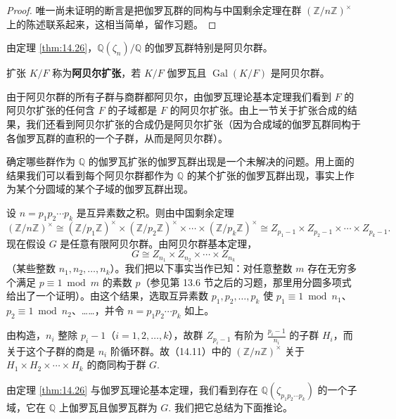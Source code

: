 \begin{proof}
唯一尚未证明的断言是把伽罗瓦群的同构与中国剩余定理在群 \((\mathbb{Z}/n\mathbb{Z})^\times\) 上的陈述联系起来，这相当简单，留作习题。
\end{proof}

由定理 \ref{thm:14.26}，\(\mathbb{Q}(\zeta_n)/\mathbb{Q}\) 的伽罗瓦群特别是阿贝尔群。

\begin{definition}
扩张 \(K/F\) 称为\textbf{阿贝尔扩张}，若 \(K/F\) 伽罗瓦且 \(\operatorname{Gal}(K/F)\) 是阿贝尔群。
\end{definition}

由于阿贝尔群的所有子群与商群都阿贝尔，由伽罗瓦理论基本定理我们看到 \(F\) 的阿贝尔扩张的任何含 \(F\) 的子域都是 \(F\) 的阿贝尔扩张。由上一节关于扩张合成的结果，我们还看到阿贝尔扩张的合成仍是阿贝尔扩张（因为合成域的伽罗瓦群同构于各伽罗瓦群的直积的一个子群，从而是阿贝尔群）。

确定哪些群作为 \(\mathbb{Q}\) 的伽罗瓦扩张的伽罗瓦群出现是一个未解决的问题。用上面的结果我们可以看到每个阿贝尔群都作为 \(\mathbb{Q}\) 的某个扩张的伽罗瓦群出现，事实上作为某个分圆域的某个子域的伽罗瓦群出现。

设 \(n = p_1p_2\cdots p_k\) 是互异素数之积。则由中国剩余定理
\begin{equation}
(\mathbb{Z}/n\mathbb{Z})^\times \cong (\mathbb{Z}/p_1\mathbb{Z})^\times \times (\mathbb{Z}/p_2\mathbb{Z})^\times \times \cdots \times (\mathbb{Z}/p_k\mathbb{Z})^\times \cong Z_{p_1-1} \times Z_{p_2-1} \times \cdots \times Z_{p_k-1}. \tag{14.11}
\end{equation}
现在假设 \(G\) 是任意有限阿贝尔群。由阿贝尔群基本定理，
\[
G \cong Z_{n_1} \times Z_{n_2} \times \cdots \times Z_{n_k}
\]
（某些整数 \(n_1, n_2, \ldots, n_k\)）。我们把以下事实当作已知：对任意整数 \(m\) 存在无穷多个满足 \(p \equiv 1 \bmod m\) 的素数 \(p\)（参见第 13.6 节之后的习题，那里用分圆多项式给出了一个证明）。由这个结果，选取互异素数 \(p_1, p_2, \ldots, p_k\) 使 \(p_1 \equiv 1 \bmod n_1\)、\(p_2 \equiv 1 \bmod n_2\)、……，并令 \(n = p_1p_2\cdots p_k\) 如上。

由构造，\(n_i\) 整除 \(p_i-1\)（\(i = 1, 2, \ldots, k\)），故群 \(Z_{p_i-1}\) 有阶为 \(\frac{p_i-1}{n_i}\) 的子群 \(H_i\)，而关于这个子群的商是 \(n_i\) 阶循环群。故（14.11）中的 \((\mathbb{Z}/n\mathbb{Z})^\times\) 关于 \(H_1 \times H_2 \times \cdots \times H_k\) 的商同构于群 \(G\).

由定理 \ref{thm:14.26} 与伽罗瓦理论基本定理，我们看到存在 \(\mathbb{Q}(\zeta_{p_1p_2\cdots p_k})\) 的一个子域，它在 \(\mathbb{Q}\) 上伽罗瓦且伽罗瓦群为 \(G\). 我们把它总结为下面推论。

